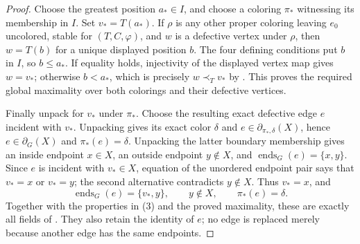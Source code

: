 \begin{proof}
Choose the greatest position \(a_*\in I\), and choose a coloring
\(\pi_*\) witnessing its membership in \(I\).  Set
\(v_*=T(a_*)\).  If \(\rho\) is any other proper coloring leaving
\(e_0\) uncolored, stable for \((T,C,\varphi)\), and \(w\) is a
defective vertex under \(\rho\), then
\(w=T(b)\) for a unique displayed position \(b\).  The four defining
conditions put \(b\) in \(I\), so \(b\leq a_*\).  If equality holds,
injectivity of the displayed vertex map gives \(w=v_*\); otherwise
\(b<a_*\), which is precisely
\(w\prec_T v_*\) by .  This proves the required
global maximality over both colorings and their defective vertices.

Finally unpack  for \(v_*\) under \(\pi_*\).
Choose the resulting exact defective edge \(e\) incident with \(v_*\).
Unpacking  gives its exact color
\(\delta\) and \(e\in\partial_{\pi_*,\delta}(X)\), hence
\(e\in\partial_G(X)\) and \(\pi_*(e)=\delta\).  Unpacking the latter
boundary membership gives an inside endpoint \(x\in X\), an outside
endpoint \(y\notin X\), and
\(\operatorname{ends}_G(e)=\{x,y\}\).  Since \(e\) is incident with
\(v_*\in X\), equation of the unordered endpoint pair says that
\(v_*=x\) or \(v_*=y\); the second alternative contradicts
\(y\notin X\).  Thus \(v_*=x\), and
\[
 \operatorname{ends}_G(e)=\{v_*,y\},\qquad
 y\notin X,\qquad \pi_*(e)=\delta .
\]
Together with the properties in (3) and the proved maximality, these are
exactly all fields of .  They also retain
the identity of \(e\); no edge is replaced merely because another edge
has the same endpoints.
\end{proof}
